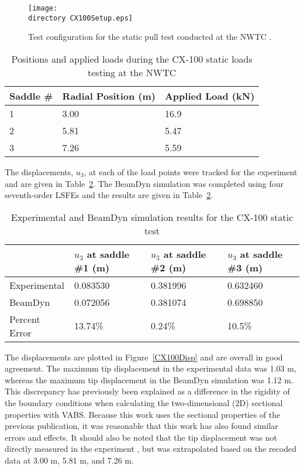 \documentclass{aiaa-tc}
\def\directory{EPSF/}
\begin{document}
\begin{figure}
\centering
\texttt{[image: \\directory CX100Setup.eps]}
\caption{Test configuration for the static pull test conducted at the NWTC \cite{paquette2006modeling}.} 
\label{CX100Setup}
\end{figure}

\begin{table} 
\caption{\label{CX100Load}Positions and applied loads during the CX-100 static loads testing at the NWTC  } 
\begin{center}
    \begin{tabular}{| l | l |l |}
    	\hline
    	 Saddle \# &     Radial Position (m) & Applied Load (kN)  \\ \hline
    1&	3.00 & 16.9         \\  \hline
    2&	5.81   & 5.47         \\ \hline
    3&	    	7.26   & 5.59         \\ \hline
    \end{tabular}
\end{center}
\end{table}

The displacements, $u_3$, at each of the load points were tracked for the experiment and are given in Table~\ref{CX100Results}. The BeamDyn simulation was completed using four seventh-order LSFEs and the results are given in Table~\ref{CX100Results}.

\begin{table}
\caption{\label{CX100Results}Experimental and BeamDyn simulation results for the CX-100 static test  } 
\begin{center}
    \begin{tabular}{| l | l | l | l |}
    	\hline
    	             & $u_3$ at saddle \#1 (m) & $u_3$ at saddle \#2 (m) & $u_3$ at saddle \#3 (m) \\ \hline
    	Experimental & 0.083530             & 0.381996               & 0.632460             \\ \hline
    	BeamDyn      & 0.072056               & 0.381074                & 0.698850           \\ \hline
    	    	Percent Error      &        13.74\%        & 0.24\%                & 10.5\%           \\ \hline
    \end{tabular}
\end{center}
\end{table} 
The displacements are plotted in Figure~\ref{CX100Disp} and are overall in good agreement. The maximum tip displacement in the experimental data was 1.03 m, whereas the maximum tip displacement in the BeamDyn simulation was 1.12 m. This discrepancy has previously been explained\cite{Luscher:2013} as a difference in the rigidity of the boundary conditions when calculating the two-dimensional (2D) sectional properties with VABS. Because this work uses the sectional properties of the previous publication, it was reasonable that this work has also found similar errors and effects. It should also be noted that the tip displacement was not directly measured in the experiment \cite{paquette2006modeling}, but was extrapolated based on the recoded data at 3.00 m, 5.81 m, and 7.26 m.
\end{document}
